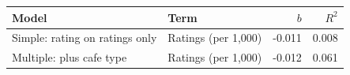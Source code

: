 \begin{tabular}{llrr}
\toprule
Model & Term & $b$ & $R^2$ \\
\midrule
Simple: rating on ratings only & Ratings (per 1,000) & -0.011 & 0.008 \\
Multiple: plus cafe type & Ratings (per 1,000) & -0.012 & 0.061 \\
\bottomrule
\end{tabular}
